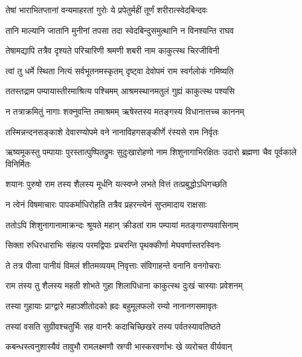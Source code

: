 \twolineshloka
{तेषां भाराभितप्तानां वन्यमाहरतां गुरोः}
{ये प्रपेतुर्महीं तूर्णं शरीरात्स्वेदबिन्दवः} %

\twolineshloka
{तानि माल्यानि जातानि मुनीनां तपसा तदा}
{स्वेदबिन्दुसमुत्थानि न विनश्यन्ति राघव} %

\twolineshloka
{तेषामद्यापि तत्रैव दृश्यते परिचारिणी}
{श्रमणी शबरी नाम काकुत्स्थ चिरजीविनी} %

\twolineshloka
{त्वां तु धर्मे स्थिता नित्यं सर्वभूतनमस्कृतम्}
{दृष्ट्वा देवोपमं राम स्वर्गलोकं गमिष्यति} %

\twolineshloka
{ततस्तद्राम पम्पायास्तीरमाश्रित्य पश्चिमम्}
{आश्रमस्थानमतुलं गुह्यं काकुत्स्थ पश्यसि} %

\twolineshloka
{न तत्राक्रमितुं नागाः शक्नुवन्ति तमाश्रमम्}
{ऋषेस्तस्य मतङ्गस्य विधानात्तच्च काननम्} %

\twolineshloka
{तस्मिन्नन्दनसङ्काशे देवारण्योपमे वने}
{नानाविहगसङ्कीर्णे रंस्यसे राम निर्वृतः} %

\threelineshloka
{ऋष्यमूकस्तु पम्पायाः पुरस्तात्पुष्पितद्रुमः}
{सुदुःखारोहणो नाम शिशुनागाभिरक्षितः}
{उदारो ब्रह्मणा चैव पूर्वकाले विनिर्मितः} %

\twolineshloka
{शयानः पुरुषो राम तस्य शैलस्य मूर्धनि}
{यत्स्वप्ने लभते वित्तं तत्प्रबुद्धोऽधिगच्छति} %

\twolineshloka
{न त्वेनं विषमाचारः पापकर्माधिरोहति}
{तत्रैव प्रहरन्त्येनं सुप्तमादाय राक्षसाः} %

\twolineshloka
{ततोऽपि शिशुनागानामाक्रन्दः श्रूयते महान्}
{क्रीडतां राम पम्पायां मतङ्गारण्यवासिनाम्} %

\twolineshloka
{सिक्ता रुधिरधाराभिः संहत्य परमद्विपाः}
{प्रचरन्ति पृथक्कीर्णा मेघवर्णास्तरस्विनः} %

\twolineshloka
{ते तत्र पीत्वा पानीयं विमलं शीतमव्ययम्}
{निवृत्ताः संविगाहन्ते वनानि वनगोचराः} %

\twolineshloka
{राम तस्य तु शैलस्य महती शोभते गुहा}
{शिलापिधाना काकुत्स्थ दुःखं चास्याः प्रवेशनम्} %

\twolineshloka
{तस्या गुहायाः प्राग्द्वारे महाञ्शीतोदको ह्रदः}
{बहुमूलफलो रम्यो नानानगसमावृतः} %

\twolineshloka
{तस्यां वसति सुग्रीवश्चतुर्भिः सह वानरैः}
{कदाचिच्छिखरे तस्य पर्वतस्यावतिष्ठते} %

\twolineshloka
{कबन्धस्त्वनुशास्यैवं तावुभौ रामलक्ष्मणौ}
{स्रग्वी भास्करवर्णाभः खे व्यरोचत वीर्यवान्} %

